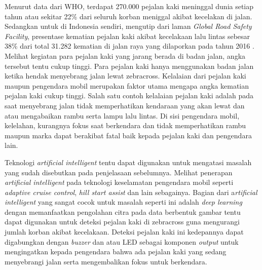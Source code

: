 \documentclass[conference]{IEEEtran}
\begin{document}
	Menurut data dari WHO, terdapat 270.000 pejalan kaki meninggal dunia setiap tahun atau sekitar 22\% dari seluruh korban meniggal akibat kecelakan di jalan\cite{who}. Sedangkan untuk di Indonesia sendiri, mengutip dari laman \textit{Global Road Safety Facility}, presentase kematian pejalan kaki akibat kecelakaan lalu lintas sebesar 38\% dari total 31.282 kematian di jalan raya yang dilaporkan pada tahun 2016 \cite{grsf}. Melihat kegiatan para pejalan kaki yang jarang berada di badan jalan, angka tersebut tentu cukup tinggi. Para pejalan kaki hanya menggunakan badan jalan ketika hendak menyebrang jalan lewat zebracross. Kelalaian dari pejalan kaki maupun pengendara mobil merupakan faktor utama mengapa angka kematian pejalan kaki cukup tinggi. Salah satu contoh kelalaian pejalan kaki adalah pada saat menyebrang jalan tidak memperhatikan kendaraan yang akan lewat dan atau mengabaikan rambu serta lampu lalu lintas. Di sisi pengendara mobil, kelelahan, kurangnya fokus saat berkendara dan tidak memperhatikan rambu maupun marka dapat berakibat fatal baik kepada pejalan kaki dan pengendara lain.
	
	\vspace{1ex}
	
	Teknologi \textit{artificial intelligent} tentu dapat digunakan untuk mengatasi masalah yang sudah disebutkan pada penjelasaan sebelumnya. Melihat penerapan \textit{artificial intelligent} pada teknologi keselamatan pengendara mobil seperti \textit{adaptive cruise control}, \textit{hill start assist} dan lain sebagainya. Bagian dari a\textit{rtificial intelligent} yang sangat cocok untuk masalah seperti ini adalah \textit{deep learning} dengan memanfaatkan pengolahan citra pada data berbentuk gambar tentu dapat digunakan untuk deteksi pejalan kaki di zebracross guna mengurangi jumlah korban akibat kecelakaan. Deteksi pejalan kaki ini kedepannya dapat digabungkan dengan \textit{buzzer} dan atau LED sebagai komponen \textit{output} untuk mengingatkan kepada pengendara bahwa ada pejalan kaki yang sedang menyebrangi jalan serta mengembalikan fokus untuk berkendara.
	
	\vspace{1ex} 
	
\end{document}
